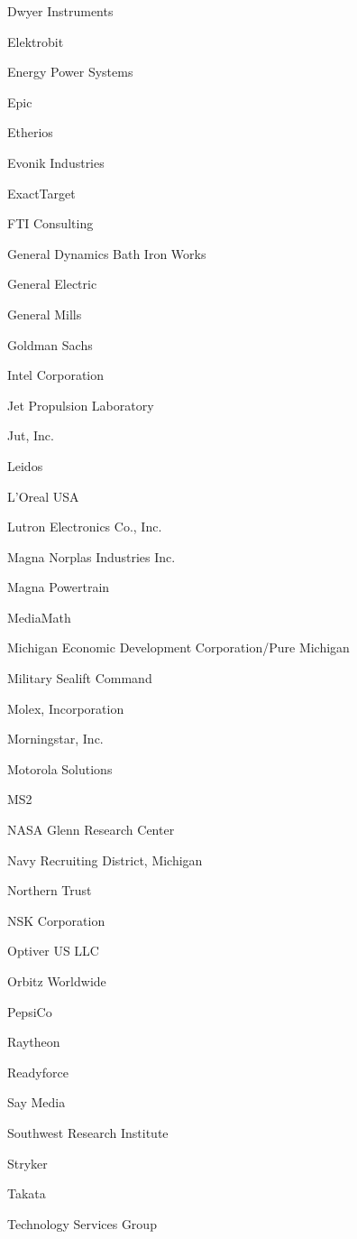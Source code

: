 \documentclass[twoside]{article}
\begin{document}
\begin{center}
\begin{multicols}{5}
\begin{FlushLeft}
\begin{compactitem}
\item Dwyer Instruments
\item Elektrobit
\item Energy Power Systems
\item Epic
\item Etherios
\item Evonik Industries
\item ExactTarget
\item FTI Consulting
\item General Dynamics Bath Iron Works
\item General Electric
\item General Mills
\item Goldman Sachs
\item Intel Corporation
\item Jet Propulsion Laboratory
\item Jut, Inc.
\item Leidos
\item L'Oreal USA
\item Lutron Electronics Co., Inc.
\item Magna Norplas Industries Inc.
\item Magna Powertrain
\item MediaMath
\item Michigan Economic Development Corporation/Pure Michigan
\item Military Sealift Command
\item Molex, Incorporation
\item Morningstar, Inc.
\item Motorola Solutions
\item MS2
\item NASA Glenn Research Center
\item Navy Recruiting District, Michigan
\item Northern Trust
\item NSK Corporation
\item Optiver US LLC
\item Orbitz Worldwide
\item PepsiCo
\item Raytheon
\item Readyforce
\item Say Media
\item Southwest Research Institute
\item Stryker
\item Takata
\item Technology Services Group

\end{compactitem}
\end{FlushLeft}
\end{multicols}
\end{center}
\end{document}
